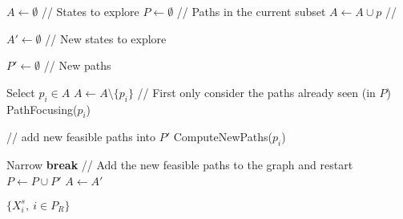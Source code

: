 \STATE $A \gets \emptyset$ // States to explore
\STATE $P \gets \emptyset$ // Paths in the current subset
	\STATE $A \gets A \cup p$
        // 
\ENDFOR

\STATE $A' \gets \emptyset$ // New states to explore

\STATE $P' \gets \emptyset$ // New paths

 \label{alg=start-ascending}
	\STATE Select $p_i \in A$
	\STATE $A \gets A \setminus \{p_i\}$
	\STATE // First only consider the paths already seen (in $P$)
	\STATE PathFocusing($p_i$)
	
	\STATE // add new feasible paths into $P'$
	\STATE ComputeNewPaths($p_i$)

\ENDWHILE \label{alg=end-ascending}
\STATE Narrow \label{alg=narrowing}
	\STATE \textbf{break}
\ENDIF 
\STATE // Add the new feasible paths to the graph and restart  \label{alg=start-add-paths}
\STATE $P \gets P \cup P'$
\STATE $A \gets A'$ \label{alg=end-add-paths}
\ENDWHILE

\STATE \RETURN $\{X_i^s,\ i \in P_R\}$


